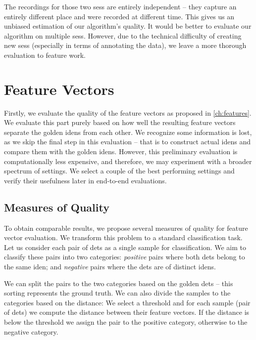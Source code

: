 The recordings for those two \glspl{ses} are entirely independent -- they
capture an entirely different place and were recorded at different time. This gives
us an unbiased estimation of our algorithm's quality. It would be better to evaluate our algorithm on multiple
\glspl{ses}. However, due to the technical difficulty of creating new \glspl{ses}
(especially in terms of annotating the data), we leave a more thorough evaluation
to feature work.

\section{Feature Vectors}

\label{sec:eval_fv}

Firstly, we evaluate the
quality of the feature vectors as proposed in \autoref{ch:features}. We evaluate this part purely based on how well the resulting feature vectors
separate the golden \glspl{iden} from each other. We recognize some
information is lost, as we skip the final step in this evaluation -- that is to
construct actual \glspl{iden} and compare them with the golden \glspl{iden}.
However, this preliminary evaluation is computationally less expensive, and
therefore, we may experiment with a broader spectrum of settings. We select a couple of the best performing settings and verify their usefulness later
in end-to-end evaluations.

\subsection{Measures of Quality}

To obtain comparable results, we propose several measures of quality for feature vector evaluation. We transform this problem to a standard classification task. Let us consider each pair of \glspl{det} as a single sample for classification. We aim to classify these pairs into two categories: \emph{positive} pairs where both \glspl{det} belong to the same \gls{iden}; and \emph{negative} pairs where the \glspl{det} are of distinct \glspl{iden}.

We can split the pairs to the two categories based on the golden \glspl{det} -- this sorting represents the ground truth. We can also divide the samples to the categories based on the distance: We select a threshold and for each sample (pair of \glspl{det}) we compute the distance between their feature vectors. If the distance is below the threshold we assign the pair to the positive category, otherwise to the negative category.

